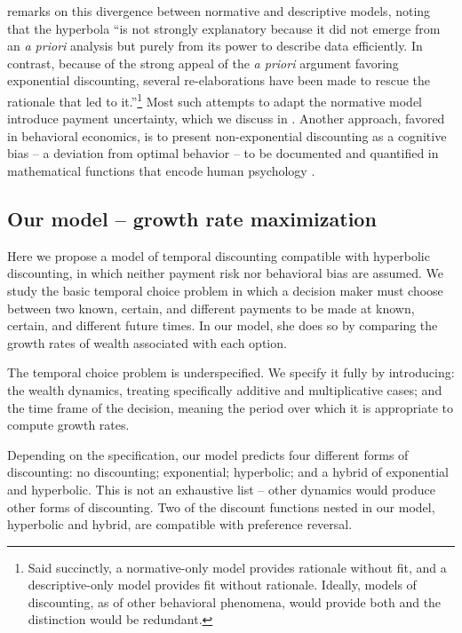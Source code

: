 \citet{Kacelnik1997} remarks on this divergence between normative and descriptive models, noting that the hyperbola ``is not strongly explanatory because it did not emerge from an {\it a priori} analysis but purely from its power to describe data efficiently. In contrast, because of the strong appeal of the {\it a priori} argument favoring exponential discounting, several re-elaborations have been made to rescue the rationale that led to it.''\footnote{Said succinctly, a normative-only model provides rationale without fit, and a descriptive-only model provides fit without rationale. Ideally, models of discounting, as of other behavioral phenomena, would provide both and the distinction would be redundant.} Most such attempts to adapt the normative model introduce payment uncertainty, which we discuss in . Another approach, favored in behavioral economics, is to present non-exponential discounting as a cognitive bias -- a deviation from optimal behavior -- to be documented and quantified in mathematical functions that encode human psychology \citep{LoewensteinPrelec1992,Laibson1997}.

\subsection{Our model -- growth rate maximization\label{sec:ourmodel}}

Here we propose a model of temporal discounting compatible with hyperbolic discounting, in which neither payment risk nor behavioral bias are assumed. We study the basic temporal choice problem in which a decision maker must choose between two known, certain, and different payments to be made at known, certain, and different future times. In our model, she does so by comparing the growth rates of wealth associated with each option.

The temporal choice problem is underspecified. We specify it fully by introducing: the wealth dynamics, treating specifically additive and multiplicative cases; and the time frame of the decision, meaning the period over which it is appropriate to compute growth rates. 

Depending on the specification, our model predicts four different forms of discounting: no discounting; exponential; hyperbolic; and a hybrid of exponential and hyperbolic. This is not an exhaustive list -- other dynamics would produce other forms of discounting. Two of the discount functions nested in our model, hyperbolic and hybrid, are compatible with preference reversal.

